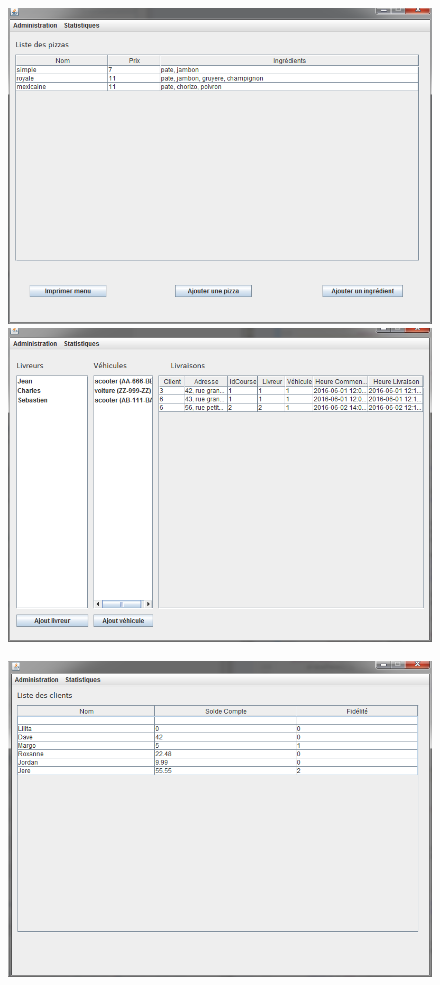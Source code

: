 \documentclass[]{article}
\begin{document}
\begin{figure}[!htb]
    \includegraphics{../img/ihm/liste_pizza.png}
\endminipage\hfill
{}
\includegraphics{../img/ihm/3emescreen.png}
\endminipage\hfill
\end{figure}

\begin{figure}[!htb]
    \includegraphics{../img/ihm/liste_clients.png}
\endminipage\hfill
\end{figure}
\end{document}
